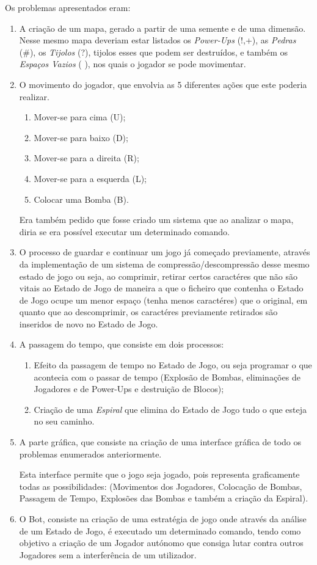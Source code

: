 \documentclass[a4paper]{article}
\begin{document}
Os problemas apresentados eram:
 \begin{enumerate}
 \item A criação de um mapa, gerado a partir de uma semente e de uma dimensão. Nesse mesmo mapa deveriam estar listados os \emph{Power-Ups} (!,+), as \emph{Pedras} (\#), os \emph{Tijolos} (?), tijolos esses que podem ser destruídos, e também os \emph{Espaços Vazios} ( ), nos quais o jogador se pode movimentar.

 \item O movimento do jogador, que envolvia as 5 diferentes ações que este poderia realizar.
  \begin{enumerate}
  \item Mover-se para cima (U);
  \item Mover-se para baixo (D);
  \item Mover-se para a direita (R);
  \item Mover-se para a esquerda (L);
  \item Colocar uma Bomba (B).
  \end{enumerate}
  Era também pedido que fosse criado um sistema que ao analizar o mapa, diria se era possível executar um determinado comando.
  
 \item O processo de guardar e continuar um jogo já começado previamente, através da implementação de um sistema de compressão/descompressão desse mesmo estado de jogo ou seja, ao comprimir, retirar certos caractéres que não são vitais ao Estado de Jogo de maneira a que o ficheiro que contenha o Estado de Jogo ocupe um menor espaço (tenha menos caractéres) que o original, em quanto que ao descomprimir, os caractéres previamente retirados são inseridos de novo no Estado de Jogo.
 
 \item A passagem do tempo, que consiste em dois processos:
 \begin{enumerate}
 \item Efeito da passagem de tempo no Estado de Jogo, ou seja programar o que acontecia com o passar de tempo (Explosão de Bombas, eliminações de Jogadores e de Power-Ups e destruição de Blocos);
 \item Criação de uma \emph{Espiral} que elimina do Estado de Jogo tudo o que esteja no seu caminho.
 \end{enumerate}

 \item A parte gráfica, que consiste na criação de uma interface gráfica de todo os problemas enumerados anteriormente. 
 
 Esta interface permite que o jogo seja jogado, pois representa graficamente todas as possibilidades: (Movimentos dos Jogadores, Colocação de Bombas, Passagem de Tempo, Explosões das Bombas e também a criação da Espiral).
 
 \item O Bot, consiste na criação de uma estratégia de jogo onde através da análise de um Estado de Jogo, é executado um determinado comando, tendo como objetivo a criação de um Jogador autónomo que consiga lutar contra outros Jogadores sem a interferência de um utilizador. 

\end{enumerate}
\newpage
\end{document}

